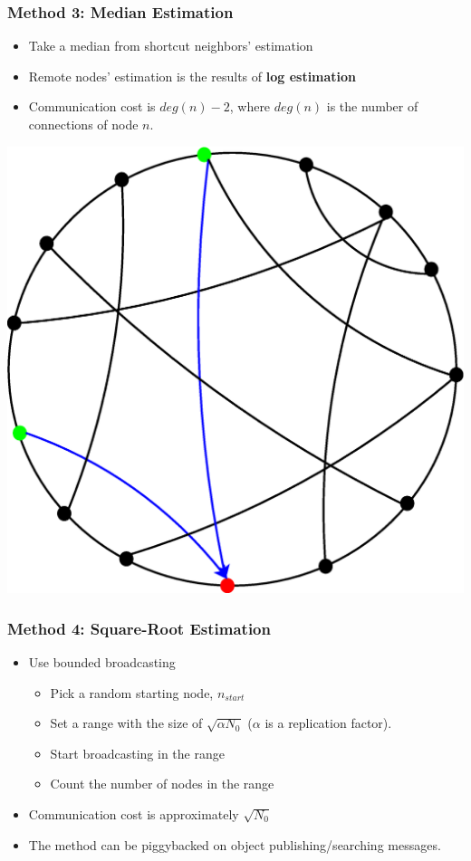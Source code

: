 \documentclass[red]{beamer}
\begin{document}
\begin{frame}
\frametitle{Method 3: Median Estimation}
\begin{minipage}{5cm}
\begin{itemize}
\item Take a median from shortcut neighbors' estimation
\item Remote nodes' estimation is the results of \textbf{log estimation} 
\item Communication cost is $deg(n)-2$, where $deg(n)$ is the number of connections of node $n$.
\end{itemize}
\end{minipage}
\begin{minipage}{5cm}
\centering
\includegraphics[scale=0.2]{figs/method3}
\end{minipage}
\end{frame}
\begin{frame}
\frametitle{Method 4: Square-Root Estimation}
\begin{itemize}
\item Use bounded broadcasting
\begin{itemize}
\item Pick a random starting node, $n_{start}$
\item Set a range with the size of $\sqrt{\alpha N_0}$ ($\alpha$ is a replication factor).
\item Start broadcasting in the range
\item Count the number of nodes in the range
\end{itemize}
\item Communication cost is approximately $\sqrt{N_0}$ 
\item The method can be piggybacked on object publishing/searching messages.
\end{itemize}
\end{frame}
\end{document}
